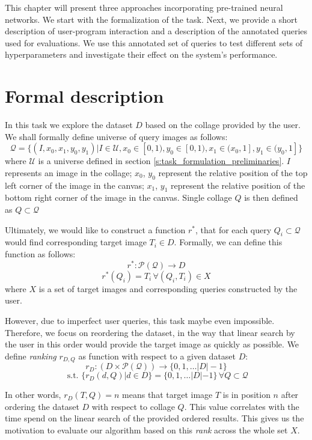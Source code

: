 This chapter will present three approaches incorporating pre-trained neural networks. We start with the formalization of the task. Next, we provide a short description of user-program interaction and a description of the annotated queries used for evaluations. We use this annotated set of queries to test different sets of hyperparameters and investigate their effect on the system's performance.

\section{Formal description}

In this task we explore the dataset $D$ based on the collage provided by the user. We shall formally define universe of query images as follows: 
$$
    \mathcal{Q} = \{(I, x_0, x_1, y_0, y_1) | I \in \mathcal{U}, x_0 \in [0,1), y_0 \in [0, 1), x_1 \in (x_0, 1], y_1 \in (y_0, 1] \}
$$
where $\mathcal{U}$ is a universe defined in section \ref{s:task_formulation_preliminaries}. $I$ represents an image in the collage; $x_0$, $y_0$ represent the relative position of the top left corner of the image in the canvas; $x_1$, $y_1$ represent the relative position of the bottom right corner of the image in the canvas. Single collage $Q$ is then defined as $Q \subset \mathcal{Q}$

Ultimately, we would like to construct a function $r^*$, that for each query $Q_i \subset \mathcal{Q}$ would find corresponding target image $T_i \in D$. Formally, we can define this function as follows:
$$
    r^*: \mathcal{P(Q)} \rightarrow D 
$$
$$
    r^*(Q_i) = T_i \, \forall (Q_i, T_i) \in X
$$
where $X$ is a set of target images and corresponding queries constructed by the user.

However, due to imperfect user queries, this task maybe even impossible. Therefore, we focus on reordering the dataset, in the way that linear search by the user in this order would provide the target image as quickly as possible. We define \emph{ranking} $r_{D, Q}$ as function with respect to a given dataset $D$:
$$
    r_D: (D \times \mathcal{P(Q)}) \rightarrow \{0, 1, \ldots |D|-1  \}
$$
$$
    \text{ s.t. } \{r_D(d, Q) | d \in D \} = \{0, 1, \ldots |D|-1  \} \, \forall Q \subset \mathcal{Q}
$$

In other words, $r_D(T, Q) = n$ means that target image $T$ is in position $n$ after ordering the dataset $D$ with respect to collage $Q$. This value correlates with the time spend on the linear search of the provided ordered results. This gives us the motivation to evaluate our algorithm based on this \emph{rank} across the whole set $X$.




